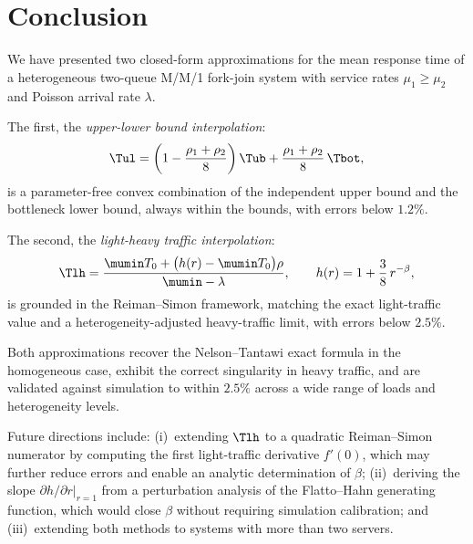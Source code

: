 \section{Conclusion}
\label{sec:conclusion}

We have presented two closed-form approximations for the mean response time
of a heterogeneous two-queue M/M/1 fork-join system with service rates
$\mu_1 \geq \mu_2$ and Poisson arrival rate $\lambda$.

The first, the \emph{upper-lower bound interpolation}:
\begin{equation}
  \Tul = \left(1 - \frac{\rho_1+\rho_2}{8}\right)\Tub
          + \frac{\rho_1+\rho_2}{8}\,\Tbot,
\end{equation}
is a parameter-free convex combination of the independent upper bound and
the bottleneck lower bound, always within the bounds, with errors below $1.2\%$.

The second, the \emph{light-heavy traffic interpolation}:
\begin{equation}
  \Tlh = \frac{\mumin T_0 + \bigl(h(r) - \mumin T_0\bigr)\rho}
              {\mumin - \lambda},
  \qquad h(r) = 1 + \frac{3}{8}\,r^{-\beta},
\end{equation}
is grounded in the Reiman--Simon framework, matching the exact light-traffic
value and a heterogeneity-adjusted heavy-traffic limit, with errors below $2.5\%$.

Both approximations recover the Nelson--Tantawi exact formula in the homogeneous
case, exhibit the correct singularity in heavy traffic, and are validated
against simulation to within $2.5\%$ across a wide range of loads and
heterogeneity levels.

Future directions include: (i)~extending $\Tlh$ to a quadratic Reiman--Simon
numerator by computing the first light-traffic derivative $f'(0)$,
which may further reduce errors and enable an analytic determination of $\beta$;
(ii)~deriving the slope $\partial h/\partial r|_{r=1}$ from a perturbation
analysis of the Flatto--Hahn generating function, which would close $\beta$
without requiring simulation calibration; and
(iii)~extending both methods to systems with more than two servers.
